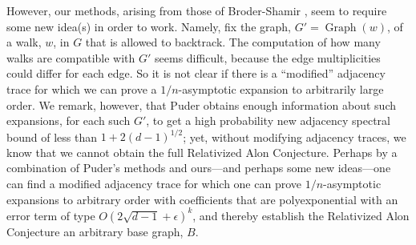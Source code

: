 \documentclass{memo-l}
\theoremstyle{plain}
\theoremstyle{definition}
\numberwithin{section}{chapter}
\numberwithin{equation}{chapter}
\DeclareMathOperator{\Graph}{Graph}
\theoremstyle{plain}
\theoremstyle{definition}
\begin{document}
However, our methods, arising from those of Broder-Shamir \cite{broder},
seem to require some new idea(s) in order to work.  Namely, fix
the graph, $G'=\Graph(w)$, of a walk, $w$, in $G$ that is allowed
to backtrack.
The computation of how many walks are compatible with $G'$ seems difficult,
because the edge multiplicities could differ for each edge.
So it is not clear if there is a ``modified'' adjacency trace for which
we can prove a
$1/n$-asymptotic expansion to arbitrarily large order.
We remark, however, that Puder \cite{puder} obtains enough 
information about such expansions,
for each such $G'$, to get a high probability new adjacency spectral
bound of less than
$1+2(d-1)^{1/2}$;
yet, without modifying adjacency traces, we know that we cannot
obtain the full Relativized Alon Conjecture.
Perhaps by a combination of Puder's methods and ours---and perhaps
some new ideas---one
can find a modified adjacency trace for which one can prove
$1/n$-asymptotic expansions to arbitrary order with coefficients that
are polyexponential with an error term of type
$O(2\sqrt{d-1}+\epsilon)^k$, and thereby establish the 
Relativized Alon Conjecture an arbitrary base graph, $B$.





\appendix

\backmatter

\end{document}

